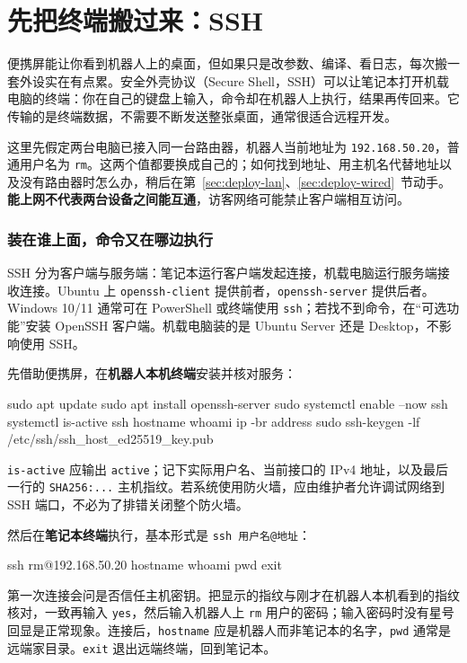 \section{先把终端搬过来：SSH}
\label{sec:deploy-ssh}

便携屏能让你看到机器人上的桌面，但如果只是改参数、编译、看日志，每次搬一套外设实在有点累。安全外壳协议（Secure Shell，SSH）可以让笔记本打开机载电脑的终端：你在自己的键盘上输入，命令却在机器人上执行，结果再传回来。它传输的是终端数据，不需要不断发送整张桌面，通常很适合远程开发。

这里先假定两台电脑已接入同一台路由器，机器人当前地址为 \texttt{192.168.50.20}，普通用户名为 \texttt{rm}。这两个值都要换成自己的；如何找到地址、用主机名代替地址以及没有路由器时怎么办，稍后在第~\ref{sec:deploy-lan}、\ref{sec:deploy-wired}~节动手。\textbf{能上网不代表两台设备之间能互通}，访客网络可能禁止客户端相互访问。

\subsubsection{装在谁上面，命令又在哪边执行}

SSH 分为客户端与服务端：笔记本运行客户端发起连接，机载电脑运行服务端接收连接。Ubuntu 上 \texttt{openssh-client} 提供前者，\texttt{openssh-server} 提供后者。Windows 10/11 通常可在 PowerShell 或终端使用 \texttt{ssh}；若找不到命令，在“可选功能”安装 OpenSSH 客户端。机载电脑装的是 Ubuntu Server 还是 Desktop，不影响使用 SSH。

\begin{example}[从笔记本进入机载电脑]
先借助便携屏，在\textbf{机器人本机终端}安装并核对服务：
\begin{tbash}
sudo apt update
sudo apt install openssh-server
sudo systemctl enable --now ssh
systemctl is-active ssh
hostname
whoami
ip -br address
sudo ssh-keygen -lf /etc/ssh/ssh_host_ed25519_key.pub
\end{tbash}
\texttt{is-active} 应输出 \texttt{active}；记下实际用户名、当前接口的 IPv4 地址，以及最后一行的 \texttt{SHA256:...} 主机指纹。若系统使用防火墙，应由维护者允许调试网络到 SSH 端口，不必为了排错关闭整个防火墙。

然后在\textbf{笔记本终端}执行，基本形式是 \texttt{ssh 用户名@地址}：
\begin{tbash}
ssh rm@192.168.50.20
hostname
whoami
pwd
exit
\end{tbash}
第一次连接会问是否信任主机密钥。把显示的指纹与刚才在机器人本机看到的指纹核对，一致再输入 \texttt{yes}，然后输入机器人上 \texttt{rm} 用户的密码；输入密码时没有星号回显是正常现象。连接后，\texttt{hostname} 应是机器人而非笔记本的名字，\texttt{pwd} 通常是远端家目录。\texttt{exit} 退出远端终端，回到笔记本。
\end{example}

